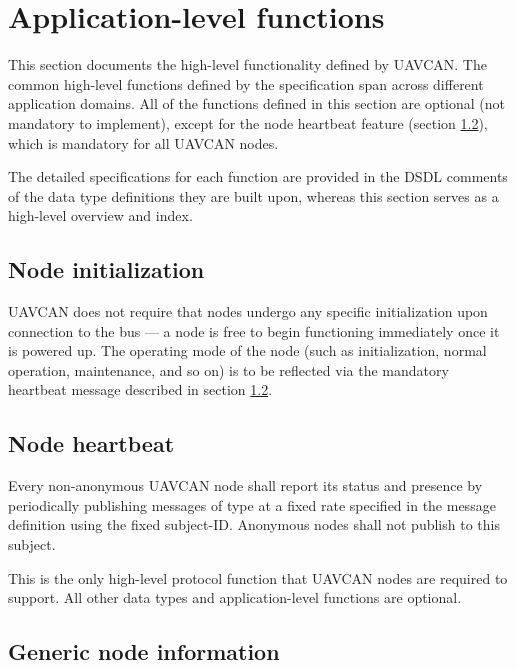 \section{Application-level functions}\label{sec:application_level_functions}

This section documents the high-level functionality defined by UAVCAN.
The common high-level functions defined by the specification span across different application domains.
All of the functions defined in this section are optional (not mandatory to implement),
except for the node heartbeat feature (section \ref{sec:application_node_heartbeat}),
which is mandatory for all UAVCAN nodes.

The detailed specifications for each function are provided in the DSDL comments of the data type definitions
they are built upon, whereas this section serves as a high-level overview and index.

\subsection{Node initialization}

UAVCAN does not require that nodes undergo any specific initialization upon connection to the bus ---
a node is free to begin functioning immediately once it is powered up.
The operating mode of the node (such as initialization, normal operation, maintenance, and so on)
is to be reflected via the mandatory heartbeat message described in section \ref{sec:application_node_heartbeat}.

\subsection{Node heartbeat}\label{sec:application_node_heartbeat}

Every non-anonymous UAVCAN node shall report its status and presence by periodically publishing messages of type
 at a fixed rate specified in the message definition using the fixed subject-ID.
Anonymous nodes shall not publish to this subject.

This is the only high-level protocol function that UAVCAN nodes are required to support.
All other data types and application-level functions are optional.


\subsection{Generic node information}

